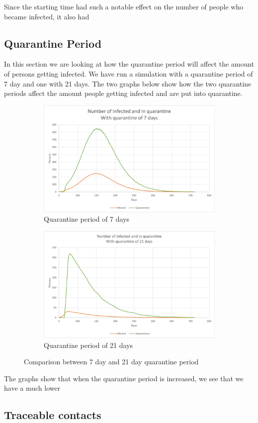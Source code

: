 Since the starting time had such a notable effect on the number of people who became infected, it also had 


\subsection{Quarantine Period}
In this section we are looking at how the quarantine period will affect the amount of persons getting infected. We have run a simulation with a quarantine period of 7 day and one with 21 days. The two graphs below show how the two quarantine periods affect the amount people getting infected and are put into quarantine.


\begin{figure}[H]
\centering
\begin{subfigure}{.5\textwidth}
  \centering
  \includegraphics[width=.95\linewidth]{0_billeder/CT_Q_7.png}
  \caption{Quarantine period of 7 days}
  \label{fig:sub1}
\end{subfigure}%
\begin{subfigure}{.5\textwidth}
  \centering
  \includegraphics[width=.95\linewidth]{0_billeder/CT_Q_21.png}
  \caption{Quarantine period of 21 days}
  \label{fig:sub2}
\end{subfigure}
\caption{Comparison between 7 day and 21 day quarantine period}
\label{fig:test}
\end{figure}

The graphs show that when the quarantine period is increased, we see that we have a much lower 

\subsection{Traceable contacts}

